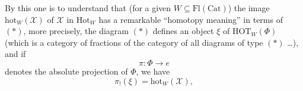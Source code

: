 \documentclass[11pt]{article}
\newcommand{\msp}[1]{\marginpar{\footnotesize [#1]}}
\begin{document}
\msp{page 122}
By this one is to understand that (for a given $W \subseteq \mathrm{Fl}(\mathrm{Cat})$) the image $\mathrm{hot}_W(\mathscr{X})$ of $\mathscr{X}$ in $\mathrm{Hot}_W$ has a remarkable ``homotopy meaning'' in terms of $(*)$, more precisely, the diagram $(*)$ defines an object $\xi$ of $\mathrm{HOT}_W(\Phi)$ (which is a category of fractions of the category of all diagrams of type $(*)$ \dots), and if
\[
\pi : \Phi \longrightarrow e
\]
denotes the absolute projection of $\Phi$, we have
\[
\pi_!(\xi) = \mathrm{hot}_W(\mathscr{X}),
\]
\end{document}
